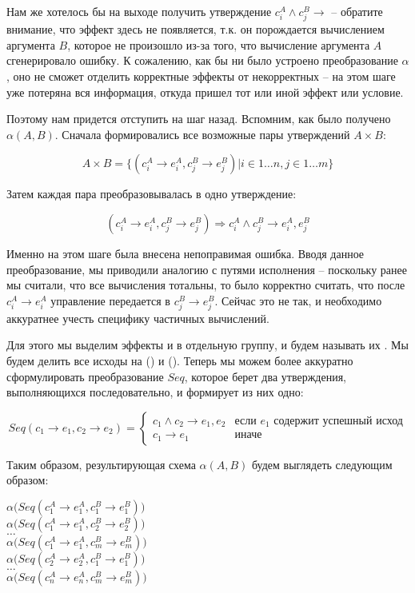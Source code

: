 Нам же хотелось бы на выходе получить утверждение $c^A_i \land c^B_j \rightarrow$  -- обратите внимание, что эффект  здесь не появляется, т.к. он порождается вычислением аргумента $B$, которое не произошло из-за того, что вычисление аргумента $A$ сгенерировало ошибку. К сожалению, как бы ни было устроено преобразование $\alpha$, оно не сможет отделить корректные эффекты от некорректных -- на этом шаге уже потеряна вся информация, откуда пришел тот или иной эффект или условие.

Поэтому нам придется отступить на шаг назад. Вспомним, как было получено $\alpha(A, B)$. Сначала формировались все возможные пары утверждений $A \times B$:

$$A \times B = \big\{ (c^A_i \rightarrow e^A_i, c^B_j \rightarrow e^B_j) \rvert i \in 1 \ldots n, j \in 1 \ldots m \big\}$$

Затем каждая пара преобразовывалась в одно утверждение:

$$ (c^A_i \rightarrow e^A_i, c^B_j \rightarrow e^B_j) \Rightarrow c^A_i \land c^B_j \rightarrow e^A_i, e^B_j $$

Именно на этом шаге была внесена непоправимая ошибка. Вводя данное преобразование, мы приводили аналогию с путями исполнения -- поскольку ранее мы считали, что все вычисления тотальны, то было корректно считать, что после $c^A_i \rightarrow e^A_i$ управление передается в $c^B_j \rightarrow e^B_j$. Сейчас это не так, и необходимо аккуратнее учесть специфику частичных вычислений.

Для этого мы выделим эффекты  и  в отдельную группу, и будем называть их . Мы будем делить все исходы на  () и  (). Теперь мы можем более аккуратно сформулировать преобразование $Seq$, которое берет два утверждения, выполняющихся последовательно, и формирует из них одно:

\[
Seq(c_1 \rightarrow e_1, c_2 \rightarrow e_2) = 
\begin{cases}
c_1 \land c_2 \rightarrow e_1, e_2 & \text{если } e_1 \text{ содержит успешный исход} \\
c_1 \rightarrow e_1 			   & \text{иначе}
\end{cases}
\]

Таким образом, результирующая схема $\alpha(A, B)$ будем выглядеть следующим образом:

{
	 $\alpha\Big(Seq (c^A_1 \rightarrow e^A_1, c^B_1 \rightarrow e^B_1) \Big)$ \\
	 $\alpha\Big(Seq (c^A_1 \rightarrow e^A_1, c^B_2 \rightarrow e^B_2) \Big)$ \\
	 $\ldots$ \\
	 $\alpha\Big(Seq (c^A_1 \rightarrow e^A_1, c^B_m \rightarrow e^B_m) \Big)$ \\
	 $\alpha\Big(Seq (c^A_2 \rightarrow e^A_2, c^B_1 \rightarrow e^B_1) \Big)$ \\
	 $\ldots$ \\
	 $\alpha\Big(Seq (c^A_n \rightarrow e^A_n, c^B_m \rightarrow e^B_m) \Big)$ \\
}
{}


